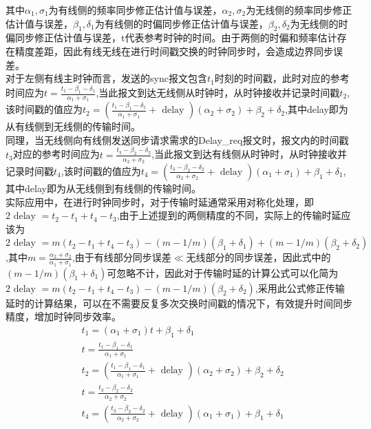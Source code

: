 \documentclass[UTF8,a4paper,12pt]{ctexart}
\numberwithin{equation}{section}
\begin{document}
其中$\alpha_1,\sigma_{1}$为有线侧的频率同步修正估计值与误差，$\alpha_2,\sigma_{2}$为无线侧的频率同步修正估计值与误差，$\beta_1,\delta_{1}$为有线侧的时偏同步修正估计值与误差，$\beta_2,\delta_{2}$为无线侧的时偏同步修正估计值与误差，t代表参考时钟的时间。由于两侧的时偏和频率估计存在精度差距，因此有线无线在进行时间戳交换的时钟同步时，会造成边界同步误差。\\
对于左侧有线主时钟而言，发送的sync报文包含$t_1$时刻的时间戳，此时对应的参考时间应为$t=\frac{t_{1}-\beta_{1}-\delta_{1}}{\alpha_{1}+\sigma_{1}}$,当此报文到达无线侧从时钟时，从时钟接收并记录时间戳$t_2$,该时间戳的值应为$t_{2}=\left(\frac{t_{1}-\beta_{1}-\delta_{1}}{\alpha_{1}+\sigma_{1}}+\text { delay }\right)\left(\alpha_{2}+\sigma_{2}\right)+\beta_{2}+\delta_{2}$,其中delay即为从有线侧到无线侧的传输时间。\\
同理，当无线侧向有线侧发送同步请求需求的Delay\_req报文时，报文内的时间戳$t_3$对应的参考时间应为$t=\frac{t_{3}-\beta_{2}-\delta_{2}}{\alpha_{2}+\sigma_{2}}$,当此报文到达有线侧从时钟时，从时钟接收并记录时间戳$t_4$,该时间戳的值应为$t_{4}=\left(\frac{t_{3}-\beta_{2}-\delta_{2}}{\alpha_{2}+\sigma_{2}}+\text { delay }\right)\left(\alpha_{1}+\sigma_{1}\right)+\beta_{1}+\delta_{1}$,其中delay即为从无线侧到有线侧的传输时间。\\
实际应用中，在进行时钟同步时，对于传输时延通常采用对称化处理，即$2 \text { delay }=t_{2}-t_{1}+t_{4}-t_{3}$,由于上述提到的两侧精度的不同，实际上的传输时延应该为$2 \text { delay }=m\left(t_{2}-t_{1}+t_{4}-t_{3}\right)-(m-1 / m)\left(\beta_{1}+\delta_{1}\right)+(m-1 / m)\left(\beta_{2}+\delta_{2}\right)$,其中$m=\frac{\alpha_{2}+\sigma_{2}}{\alpha_{1}+\sigma_{1}}$,由于有线部分同步误差$\ll$无线部分的同步误差，因此式中的$(m-1 / m)\left(\beta_{1}+\delta_{1}\right)$可忽略不计，因此对于传输时延的计算公式可以化简为$2 \text { delay }=m\left(t_{2}-t_{1}+t_{4}-t_{3}\right)-(m-1 / m)\left(\beta_{2}+\delta_{2}\right)$,采用此公式修正传输延时的计算结果，可以在不需要反复多次交换时间戳的情况下，有效提升时间同步精度，增加时钟同步效率。
\begin{eqnarray}
	&t_{1}=\left(\alpha_{1}+\sigma_{1}\right) t+\beta_{1}+\delta_{1}\\
	&t=\frac{t_{1}-\beta_{1}-\delta_{1}}{\alpha_{1}+\sigma_{1}}\\
	&t_{2}=\left(\frac{t_{1}-\beta_{1}-\delta_{1}}{\alpha_{1}+\sigma_{1}}+\text { delay }\right)\left(\alpha_{2}+\sigma_{2}\right)+\beta_{2}+\delta_{2}\\
	&t=\frac{t_{3}-\beta_{2}-\delta_{2}}{\alpha_{2}+\sigma_{2}}\\
	&t_{4}=\left(\frac{t_{3}-\beta_{2}-\delta_{2}}{\alpha_{2}+\sigma_{2}}+\text { delay }\right)\left(\alpha_{1}+\sigma_{1}\right)+\beta_{1}+\delta_{1}
\end{eqnarray}
\end{document}
